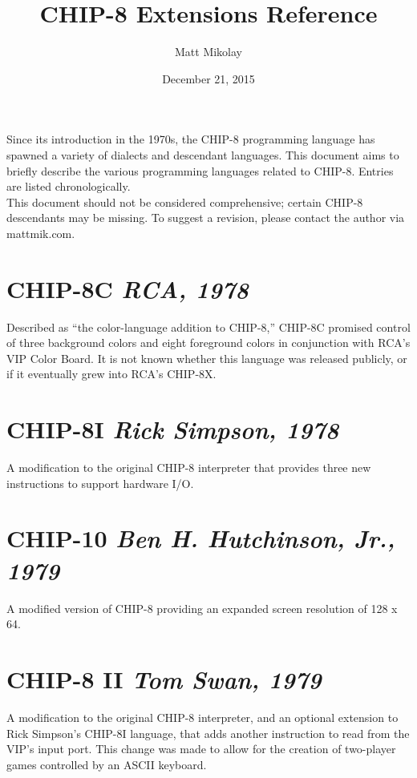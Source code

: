 \documentclass{article}
\title{CHIP-8 Extensions Reference}
\author{Matt Mikolay}
\date{December 21, 2015}
\newcommand{\subtitle}[1] {{\hfill \small{\emph{#1}}}}
\begin{document}
\maketitle

\begin{multicols}{2}
Since its introduction in the 1970s, the CHIP-8 programming language has spawned a variety of dialects and descendant languages. This document aims to briefly describe the various programming languages related to CHIP-8. Entries are listed chronologically. \\

This document should not be considered comprehensive; certain CHIP-8 descendants may be missing. To suggest a revision, please contact the author via mattmik.com.

\section*{CHIP-8C \subtitle{RCA, 1978}}
Described as ``the color-language addition to CHIP-8,'' CHIP-8C promised control of three background colors and eight foreground colors in conjunction with RCA's VIP Color Board. It is not known whether this language was released publicly, or if it eventually grew into RCA's CHIP-8X. \cite{chip8c}

\section*{CHIP-8I \subtitle{Rick Simpson, 1978}}
A modification to the original CHIP-8 interpreter that provides three new instructions to support hardware I/O. \cite{chip8i}

\section*{CHIP-10 \subtitle{Ben H. Hutchinson, Jr., 1979}}
A modified version of CHIP-8 providing an expanded screen resolution of 128 x 64. \cite{chip10}

\section*{CHIP-8 II \subtitle{Tom Swan, 1979}}
A modification to the original CHIP-8 interpreter, and an optional extension to Rick Simpson's CHIP-8I language, that adds another instruction to read from the VIP's input port. This change was made to allow for the creation of two-player games controlled by an ASCII keyboard. \cite{chip8ii}


\end{multicols}
\end{document}
